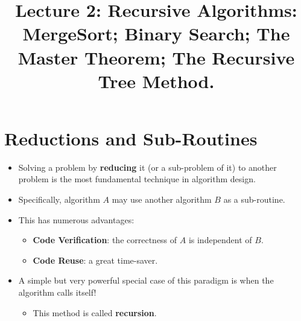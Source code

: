 \documentclass[12pt]{article}
\title{\huge Lecture 2: Recursive Algorithms: MergeSort; Binary Search; The Master Theorem; The Recursive Tree Method.}
\author{}
\date{}
\begin{document}
\maketitle
\section{Reductions and Sub-Routines}
\renewcommand{\labelitemii}{$\circ$}
\renewcommand{\labelitemiii}{$\cdot$}
\renewcommand{\labelitemiii}{$\rightarrow$}
\begin{itemize}
\item Solving a problem by \textbf{reducing} it (or a sub-problem of it) to another problem is the most fundamental technique in algorithm design.
\item Specifically, algorithm $A$ may use another algorithm $B$ as a sub-routine.
\item This has numerous advantages:
	\begin{itemize}
	\item \textbf{Code Verification}: the correctness of $A$ is independent of $B$.
	\item \textbf{Code Reuse}: a great time-saver.
	\end{itemize}
\item A simple but very powerful special case of this paradigm is when the algorithm calls itself!
	\begin{itemize}
	\item This method is called \textbf{recursion}.
	\end{itemize}
\end{itemize}
\end{document}
